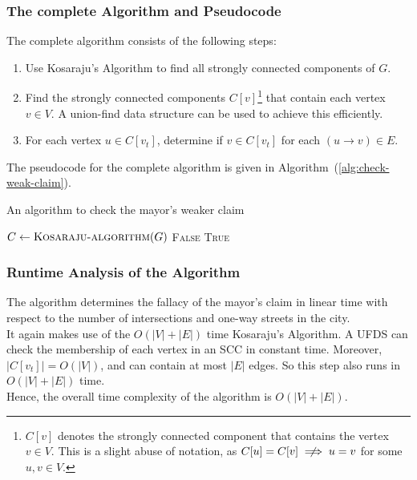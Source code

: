 \documentclass[12pt]{report}
\begin{document}
    \subsubsection*{The complete Algorithm and Pseudocode}
    The complete algorithm consists of the following steps:
    \begin{enumerate}
        \item Use Kosaraju's Algorithm to find all strongly connected components of $G$.
        \item Find the strongly connected components $C[v]$\footnote{
            $C[v]$ denotes the strongly connected component that contains the vertex $v \in V$. This is a slight abuse of notation, as $C[u] = C[v] \centernot\implies u = v$ for some $u, v \in V$.
        } that contain each vertex $v \in V$. A union-find data structure can be used to achieve this efficiently.
        \item For each vertex $u \in C[v_{t}]$, determine if $v \in C[v_{t}]$ for each $(u \to v) \in E$.
    \end{enumerate}
    The pseudocode for the complete algorithm is given in Algorithm~(\ref{alg:check-weak-claim}).
    \vspace*{5pt}

    \begin{algorithm}
        \caption{An algorithm to check the mayor's weaker claim}
        \label{alg:check-weak-claim}
        \begin{algorithmic}[1]
            \State $C \gets \Call{Kosaraju-algorithm}{G}$ 
                        \State \Return \textsc{False}
                    \EndIf
                \EndFor
            \EndFor
            \State \Return \textsc{True}
            \EndProcedure
        \end{algorithmic}
    \end{algorithm}

    \subsubsection*{Runtime Analysis of the Algorithm}
    The algorithm determines the fallacy of the mayor's claim in linear time with respect to the number of intersections and one-way streets in the city. \\
    It again makes use of the $O(|V|+|E|)$ time Kosaraju's Algorithm.
    A UFDS can check the membership of each vertex in an SCC in constant time.
    Moreover, $|C[v_{t}]| = O(|V|)$, and can contain at most $|E|$ edges.
    So this step also runs in $O(|V|+|E|)$ time.
    \vspace*{10pt} \\
    Hence, the overall time complexity of the algorithm is $O(|V|+|E|)$.
\end{document}
